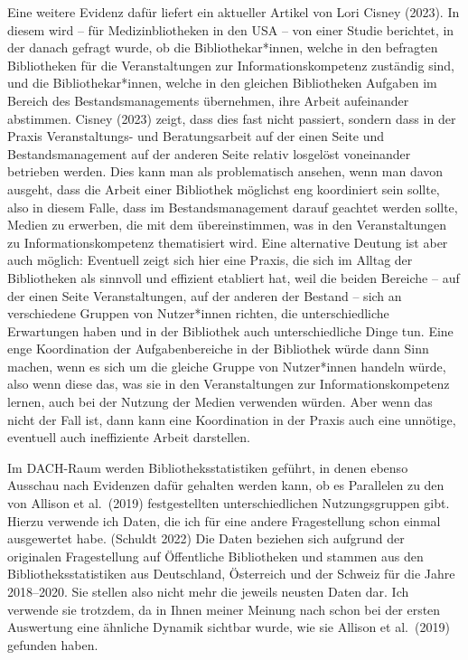 \documentclass[a4paper,
fontsize=11pt,
oneside,
numbers=noperiodatend,
parskip=half-,
bibliography=totoc,
final
]{scrartcl}
\begin{document}
Eine weitere Evidenz dafür liefert ein aktueller Artikel von Lori Cisney
(2023). In diesem wird -- für Medizinbliotheken in den USA -- von einer
Studie berichtet, in der danach gefragt wurde, ob die
Bibliothekar*innen, welche in den befragten Bibliotheken für die
Veranstaltungen zur Informationskompetenz zuständig sind, und die
Bibliothekar*innen, welche in den gleichen Bibliotheken Aufgaben im
Bereich des Bestandsmanagements übernehmen, ihre Arbeit aufeinander
abstimmen. Cisney (2023) zeigt, dass dies fast nicht passiert, sondern
dass in der Praxis Veranstaltungs- und Beratungsarbeit auf der einen
Seite und Bestandsmanagement auf der anderen Seite relativ losgelöst
voneinander betrieben werden. Dies kann man als problematisch ansehen,
wenn man davon ausgeht, dass die Arbeit einer Bibliothek möglichst eng
koordiniert sein sollte, also in diesem Falle, dass im
Bestandsmanagement darauf geachtet werden sollte, Medien zu erwerben,
die mit dem übereinstimmen, was in den Veranstaltungen zu
Informationskompetenz thematisiert wird. Eine alternative Deutung ist
aber auch möglich: Eventuell zeigt sich hier eine Praxis, die sich im
Alltag der Bibliotheken als sinnvoll und effizient etabliert hat, weil
die beiden Bereiche -- auf der einen Seite Veranstaltungen, auf der
anderen der Bestand -- sich an verschiedene Gruppen von Nutzer*innen
richten, die unterschiedliche Erwartungen haben und in der Bibliothek
auch unterschiedliche Dinge tun. Eine enge Koordination der
Aufgabenbereiche in der Bibliothek würde dann Sinn machen, wenn es sich
um die gleiche Gruppe von Nutzer*innen handeln würde, also wenn diese
das, was sie in den Veranstaltungen zur Informationskompetenz lernen,
auch bei der Nutzung der Medien verwenden würden. Aber wenn das nicht
der Fall ist, dann kann eine Koordination in der Praxis auch eine
unnötige, eventuell auch ineffiziente Arbeit darstellen.

Im DACH-Raum werden Bibliotheksstatistiken geführt, in denen ebenso
Ausschau nach Evidenzen dafür gehalten werden kann, ob es Parallelen zu
den von Allison et al.~(2019) festgestellten unterschiedlichen
Nutzungsgruppen gibt. Hierzu verwende ich Daten, die ich für eine andere
Fragestellung schon einmal ausgewertet habe. (Schuldt 2022) Die Daten
beziehen sich aufgrund der originalen Fragestellung auf Öffentliche
Bibliotheken und stammen aus den Bibliotheksstatistiken aus Deutschland,
Österreich und der Schweiz für die Jahre 2018--2020. Sie stellen also
nicht mehr die jeweils neusten Daten dar. Ich verwende sie trotzdem, da
in Ihnen meiner Meinung nach schon bei der ersten Auswertung eine
ähnliche Dynamik sichtbar wurde, wie sie Allison et al.~(2019) gefunden
haben.
\end{document}
